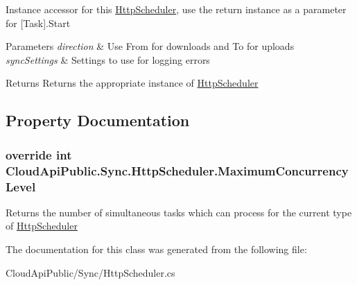 Instance accessor for this \hyperlink{class_cloud_api_public_1_1_sync_1_1_http_scheduler}{Http\-Scheduler}, use the return instance as a parameter for \mbox{[}Task\mbox{]}.Start 


\begin{DoxyParams}{Parameters}
{\em direction} & Use From for downloads and To for uploads\\
\hline
{\em sync\-Settings} & Settings to use for logging errors\\
\hline
\end{DoxyParams}
\begin{DoxyReturn}{Returns}
Returns the appropriate instance of \hyperlink{class_cloud_api_public_1_1_sync_1_1_http_scheduler}{Http\-Scheduler}
\end{DoxyReturn}


\subsection{Property Documentation}
\hypertarget{class_cloud_api_public_1_1_sync_1_1_http_scheduler_a2d4b8f13a92d4825cf12e9eb18578d95}{
\subsubsection[{Maximum\-Concurrency\-Level}]{\setlength{\rightskip}{0pt plus 5cm}override int Cloud\-Api\-Public.\-Sync.\-Http\-Scheduler.\-Maximum\-Concurrency\-Level\hspace{0.3cm}{\ttfamily [get]}}}\label{class_cloud_api_public_1_1_sync_1_1_http_scheduler_a2d4b8f13a92d4825cf12e9eb18578d95}


Returns the number of simultaneous tasks which can process for the current type of \hyperlink{class_cloud_api_public_1_1_sync_1_1_http_scheduler}{Http\-Scheduler} 



The documentation for this class was generated from the following file\-:\begin{DoxyCompactItemize}
\item 
Cloud\-Api\-Public/\-Sync/Http\-Scheduler.\-cs\end{DoxyCompactItemize}

